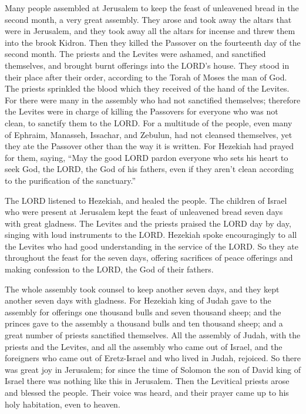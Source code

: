 \myverse{}Many people assembled at Jerusalem to keep the feast of unleavened
bread in the second month, a very great assembly.
\myverse{}They arose and took away the altars that were in Jerusalem, and they took
away all the altars for incense and threw them into the brook Kidron.
\myverse{}Then they killed the Passover on the fourteenth day of the second month.
The priests and the Levites were ashamed, and sanctified themselves, and brought burnt offerings into
the LORD’s house.
\myverse{}They stood in their place after their order, according to the Torah of Moses
the man of God. The priests sprinkled the blood which they received of the hand of the Levites.
\myverse{}For there were many in the assembly who had not sanctified themselves; therefore
the Levites were in charge of killing the Passovers for everyone who was not clean, to sanctify them to
the LORD.
\myverse{}For a multitude of the people, even many of Ephraim, Manasseh, Issachar,
and Zebulun, had not cleansed themselves, yet they ate the Passover other than the way it is written.
For Hezekiah had prayed for them, saying, “May the good LORD pardon everyone
\myverse{}who sets his heart to seek God, the LORD, the God of his fathers, even if
they aren’t clean according to the purification of the sanctuary.”

\myverse{}The LORD listened to Hezekiah, and healed the people.
\myverse{}The children of Israel who were present at Jerusalem kept the feast of unleavened
bread seven days with great gladness. The Levites and the priests praised the LORD day by day, singing
with loud instruments to the LORD.
\myverse{}Hezekiah spoke encouragingly to all the Levites who had good understanding
in the service of the LORD. So they ate throughout the feast for the seven days, offering sacrifices of
peace offerings and making confession to the LORD, the God of their fathers.

\myverse{}The whole assembly took counsel to keep another seven days,
and they kept another seven days with gladness.
\myverse{}For Hezekiah king of Judah gave to the assembly for offerings one thousand
bulls and seven thousand sheep; and the princes gave to the assembly a thousand bulls and ten thousand
sheep; and a great number of priests sanctified themselves.
\myverse{}All the assembly of Judah, with the priests and the Levites, and all the
assembly who came out of Israel, and the foreigners who came out of Eretz-Israel and who lived in Judah,
rejoiced.
\myverse{}So there was great joy in Jerusalem; for since the time of Solomon the son
of David king of Israel there was nothing like this in Jerusalem.
\myverse{}Then the Levitical priests arose and blessed the people. Their voice was
heard, and their prayer came up to his holy habitation, even to heaven.


